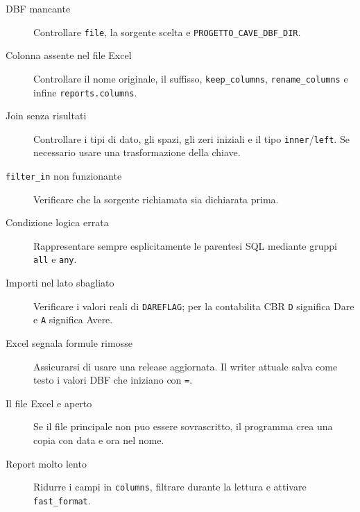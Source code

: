\begin{description}
  \item[DBF mancante]
  Controllare \texttt{file}, la sorgente scelta e
  \texttt{PROGETTO\_CAVE\_DBF\_DIR}.

  \item[Colonna assente nel file Excel]
  Controllare il nome originale, il suffisso, \texttt{keep\_columns},
  \texttt{rename\_columns} e infine \texttt{reports.columns}.

  \item[Join senza risultati]
  Controllare i tipi di dato, gli spazi, gli zeri iniziali e il tipo
  \texttt{inner}/\texttt{left}. Se necessario usare una trasformazione della
  chiave.

  \item[\texttt{filter\_in} non funzionante]
  Verificare che la sorgente richiamata sia dichiarata prima.

  \item[Condizione logica errata]
  Rappresentare sempre esplicitamente le parentesi SQL mediante gruppi
  \texttt{all} e \texttt{any}.

  \item[Importi nel lato sbagliato]
  Verificare i valori reali di \texttt{DAREFLAG}; per la contabilita CBR
  \texttt{D} significa Dare e \texttt{A} significa Avere.

  \item[Excel segnala formule rimosse]
  Assicurarsi di usare una release aggiornata. Il writer attuale salva come
  testo i valori DBF che iniziano con \texttt{=}.

  \item[Il file Excel e aperto]
  Se il file principale non puo essere sovrascritto, il programma crea una
  copia con data e ora nel nome.

  \item[Report molto lento]
  Ridurre i campi in \texttt{columns}, filtrare durante la lettura e attivare
  \texttt{fast\_format}.
\end{description}
